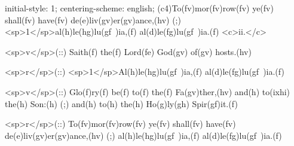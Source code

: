 initial-style: 1;
centering-scheme: english;
(c4)To(fv)mor(fv)row(fv) ye(fv) shall(fv) have(fv) de(e)liv(gv)er(gv)ance,(hv) (;) <sp>1</sp>al(h)le(hg)lu(gf~)ia,(f) al(d)le(fg)lu(gf~)ia.(f) <c>ii.</c>

<sp>v</sp>(::) Saith(f) the(f) Lord(fe) God(gv) of(gv) hosts.(hv) 

<sp>r</sp>(::) <sp>1</sp>Al(h)le(hg)lu(gf~)ia,(f) al(d)le(fg)lu(gf~)ia.(f) 

<sp>v</sp>(::) Glo(f)ry(f) be(f) to(f) the(f) Fa(gv)ther,(hv) and(h) to(ixhi) the(h) Son:(h) (;) and(h) to(h) the(h) Ho(g)ly(gh) Spir(gf)it.(f)

<sp>r</sp>(::) To(fv)mor(fv)row(fv) ye(fv) shall(fv) have(fv) de(e)liv(gv)er(gv)ance,(hv) (;) al(h)le(hg)lu(gf~)ia,(f) al(d)le(fg)lu(gf~)ia.(f) 